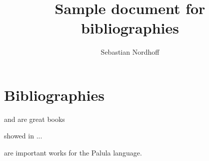 \documentclass[colorlinks,citecolor=blue]{scrartcl}
\author{Sebastian Nordhoff}
\title{Sample document for bibliographies}
\begin{document}
\maketitle 
\section{Bibliographies}
\citet{Chomsky1957} and \citet{Comrie1981} are great books

\citealt{Chomsky1957}

\citet{Chomsky1957}

\citep{Chomsky1957}

\citet[23]{Chomsky1957}

\citep[23]{Chomsky1957}

\citet{Chomsky1957,Comrie1981}

\citeauthor{Chomsky1957} showed in \citeyear{Chomsky1957} ...


\citet{Decker1992,Bashir2003dardic,Bashir2003palula,Liljegren2008,Liljegren2016,Kogan2015} are important works for the Palula language. 

\printbibliography 
\end{document}

